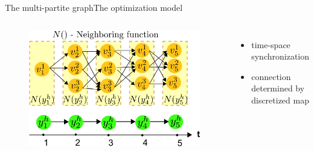 \begin{frame}{The multi-partite graph}{The optimization model}

\begin{columns}

\begin{minipage}[c]{\textwidth}
\begin{figure}
\centering
\includegraphics[width = \textwidth]{./figure/MultiPartite}
\end{figure}
\end{minipage}

\begin{minipage}[c]{\textwidth}
\begin{itemize}
\item time-space synchronization
\item connection determined by discretized map
\end{itemize}
\end{minipage}

\end{columns}

\end{frame}

